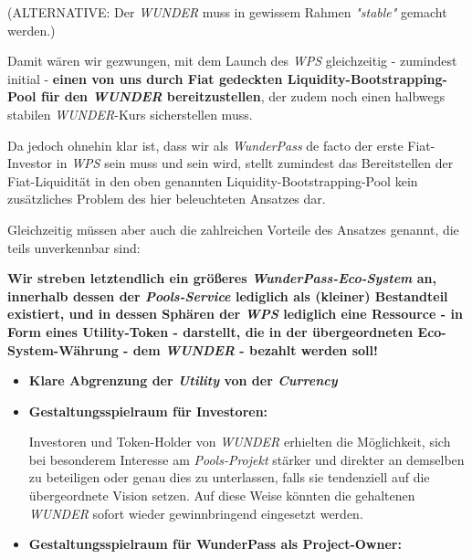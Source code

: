 \begin{Konzept}
\begin{itemize}
	(ALTERNATIVE: Der \textit{WUNDER} muss in gewissem Rahmen \textit{"stable"}  gemacht werden.)
\end{itemize}

\noindent\hrulefill
\vspace{0.2cm}

Damit wären wir gezwungen, mit dem Launch des \textit{WPS} gleichzeitig - zumindest initial - \textbf{einen von uns durch Fiat gedeckten Liquidity-Bootstrapping-Pool für den \textit{WUNDER} bereitzustellen}, der zudem noch einen halbwegs stabilen \textit{WUNDER}-Kurs sicherstellen muss.

\vspace{0.2cm}

Da jedoch ohnehin klar ist, dass wir als \textit{WunderPass} de facto der erste Fiat-Investor in \textit{WPS} sein muss und sein wird, stellt zumindest das Bereitstellen der Fiat-Liquidität in den oben genannten Liquidity-Bootstrapping-Pool kein zusätzliches Problem des hier beleuchteten Ansatzes dar.

\noindent\hrulefill

\vspace{0.2cm}

Gleichzeitig müssen aber auch die zahlreichen Vorteile des Ansatzes genannt, die teils unverkennbar sind:

\vspace{0.2cm}

\textbf{Wir streben letztendlich ein größeres \textit{WunderPass-Eco-System} an, innerhalb dessen der \textit{Pools-Service} lediglich als (kleiner) Bestandteil exi\-stiert, und in dessen Sphären der \textit{WPS} lediglich eine Ressource - in Form eines Utility-Token - darstellt, die in der übergeordneten Eco-System-Währung - dem \textit{WUNDER} - bezahlt werden soll!}

\vspace{0.2cm}

\begin{itemize}
	\item \textbf{Klare Abgrenzung der \textit{Utility} von der \textit{Currency}}
	\item \textbf{Gestaltungsspielraum für Investoren:}
	
	Investoren und Token-Holder von \textit{WUNDER} erhielten die Möglichkeit, sich bei besonderem Interesse am \textit{Pools-Projekt} stärker und direkter an demselben zu beteiligen oder genau dies zu unterlassen, falls sie tendenziell auf die übergeordnete Vision setzen. Auf diese Weise könnten die gehaltenen \textit{WUNDER} sofort wieder gewinnbringend eingesetzt werden.
	\item \textbf{Gestaltungsspielraum für WunderPass als Project-Owner:}
	

\end{itemize}
\end{Konzept}
